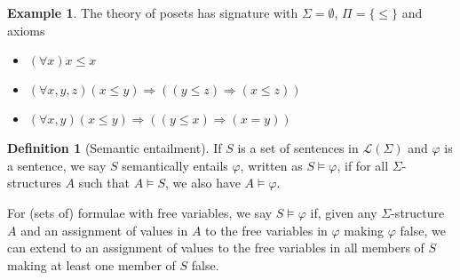 \documentclass[a4paper]{article}
\theoremstyle{definition}
\newtheorem*{defi}{Definition}
\newtheorem*{eg}{Example}
\newcommand{\La}{\mathcal{L}}
\begin{document}
\begin{eg}
  The theory of posets has signature with $\Sigma = \emptyset$, $\Pi = \{\leq\}$ and axioms
  \begin{itemize}
  \item $(\forall x) x\leq x$
  \item $(\forall x, y, z) (x\leq y)\Rightarrow ((y\leq z)\Rightarrow (x\leq z))$
  \item $(\forall x, y) (x\leq y)\Rightarrow ((y\leq x)\Rightarrow (x = y))$
  \end{itemize}
\end{eg}

\begin{defi}[Semantic entailment]
  If $S$ is a set of sentences in $\La(\Sigma)$ and $\varphi$ is a sentence, we say $S$ semantically entails $\varphi$, written as $S\models \varphi$, if for all $\Sigma$-structures $A$ such that $A\models S$, we also have $A\models \varphi$.

For (sets of) formulae with free variables, we say $S\models \varphi$ if, given any $\Sigma$-structure $A$ and an assignment of values in $A$ to the free variables in $\varphi$ making $\varphi$ false, we can extend to an assignment of values to the free variables in all members of $S$ making at least one member of $S$ false.
\end{defi}
\end{document}
